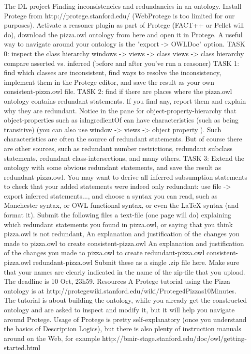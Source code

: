The DL project
Finding inconsistencies and redundancies in an ontology.
Install Protege from http://protege.stanford.edu/ (WebProtege is too limited for our purposes). Activate a reasoner plugin as part of Protege (FACT++ or Pellet will do), download the pizza.owl ontology from here and open it in Protege. A useful way to navigate around your ontology is the "export -> OWLDoc" option.
TASK 0: inspect the class hierarchy windows -> views -> class views -> class hierarchy compare asserted vs. inferred (before and after you've run a reasoner)
TASK 1: find which classes are inconsistent, find ways to resolve the inconsistency, implement them in the Protege editor, and save the result as your own consistent-pizza.owl file.
TASK 2: find if there are places where the pizza.owl ontology contains redundant statements. If you find any, report them and explain why they are redundant. Notice in the pane for object-property-hierarchy that object-properties such as isIngredientOf can have characteristics (such as being transitive) (you can also use window -> views -> object property ). Such characteristics are often the source of redundant statements. But of course there are other sources, such as redundant number restrictions, redundant subclass statements, redundant class-intersections, and many others.
TASK 3: Extend the ontology with some obvious redundant statements, and save the result as redundant-pizza.owl. You may want to derive all inferred subsumption statements to check that your added statements were indeed only redundant: use file -> export inferred statements..., and choose a syntax you can read, such as Manchester syntax, or OWL functional syntax, or even the LaTeX syntax (and format it).
Submit the following files
a text-file (one page will do) explaining
which redundant statements you found in pizza.owl, or saying that you think pizza.owl is not redundant,
An explanation and justification of the changes you made to pizza.owl to create consistent-pizza.owl
An explanation and justification of the changes you made to pizza.owl to create redundant-pizza.owl
consistent-pizza.owl
redundant-pizza.owl
Submit these as a single .zip file here. Make sure that your names are clearly indicated in the name of the zip-file that you upload. The deadline is 10 Oct, 23h59.
Resources
A Protege tutorial using the Pizza ontology is at http://protegewiki.stanford.edu/wiki/Protege4Pizzas10Minutes. The tutorial is about building the ontology, while you already get the constructed ontology and are asked to inspect and modify it, but it will help you navigate around Protege.
Usage of Protege is pretty self-explanatory (once you understand the basics of Description Logics), but there is also plenty of instruction manuals around on the Web, for example http://bmir-stage.stanford.edu/doc/owl/getting-started.html
